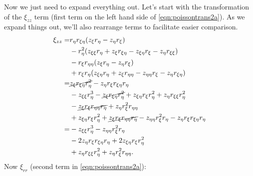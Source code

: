 Now we just need to expand everything out.
%
Let's start with the transformation of the \(\xi_{zz}\) term (first term on the left hand side of \cref{eqn:poissontrans2a}).
%
As we expand things out, we'll also rearrange terms to facilitate easier comparison.
\begin{equation}
\begin{aligned}
		\xi_{zz} =& r_\eta r_{\xi\eta}(z_\xi r_\eta - z_\eta r_\xi) \\
		&- r_\eta^2 (z_{\xi\xi} r_\eta + z_\xi r_{\xi\eta} - z_{\xi\eta} r_\xi - z_\eta r_{\xi\xi}) \\
		&-  r_\xi r_{\eta\eta}(z_\xi r_\eta - z_\eta r_\xi) \\
		&+ r_\xi r_\eta (z_{\xi\eta} r_\eta + z_\xi r_{\eta\eta} - z_{\eta\eta} r_\xi - z_\eta r_{\xi\eta}) \\
		=& \cancel{z_\xi r_{\xi\eta} r_\eta^2} - z_\eta  r_\xi r_{\xi\eta} r_\eta   \\
		&- z_{\xi\xi} r_\eta^3 - \cancel{z_\xi r_{\xi\eta} r_\eta^2} + z_{\xi\eta} r_\xi r_\eta^2  + z_\eta r_{\xi\xi} r_\eta^2   \\
		&- \cancel{z_\xi r_\xi r_{\eta\eta}  r_\eta} +  z_\eta r_\xi^2 r_{\eta\eta} \\
		&+ z_{\xi\eta} r_\xi r_\eta^2 + \cancel{z_\xi r_\xi r_{\eta\eta}  r_\eta} - z_{\eta\eta} r_\xi^2 r_\eta - z_\eta r_\xi r_{\xi\eta}  r_\eta \\
		=&- z_{\xi\xi} r_\eta^3 - z_{\eta\eta} r_\xi^2 r_\eta    \\
		& - 2 z_\eta  r_\xi r_{\xi\eta} r_\eta  + 2z_{\xi\eta} r_\xi r_\eta^2     \\
		& + z_\eta r_{\xi\xi} r_\eta^2 +  z_\eta r_\xi^2 r_{\eta\eta}. \\
\end{aligned}
\end{equation}
%
Now \(\xi_{rr}\) (second term in \cref{eqn:poissontrans2a}):
%
